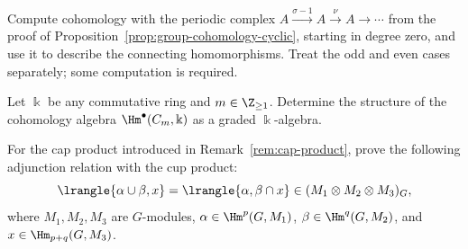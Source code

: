 \begin{Exercises}
	\begin{hint}
		Compute cohomology with the periodic complex
		$A\xrightarrow{\sigma-1}A\xrightarrow{\nu}A\to\cdots$ from the proof
		of Proposition~\ref{prop:group-cohomology-cyclic}, starting in degree
		zero, and use it to describe the connecting homomorphisms. Treat the odd
		and even cases separately; some computation is required.
	\end{hint}

	\item Let $\Bbbk$ be any commutative ring and $m\in\Z_{\geq1}$.
	Determine the structure of the cohomology algebra
	$\Hm^\bullet(C_m,\Bbbk)$ as a graded $\Bbbk$-algebra.

	\item For the cap product introduced in Remark~\ref{rem:cap-product},
	prove the following adjunction relation with the cup product:
	\[ \lrangle{\alpha\cup\beta,x}
	=\lrangle{\alpha,\beta\cap x}\in(M_1\otimes M_2\otimes M_3)_G, \]
	where $M_1,M_2,M_3$ are $G$-modules,
	$\alpha\in\Hm^p(G,M_1)$, $\beta\in\Hm^q(G,M_2)$, and
	$x\in\Hm_{p+q}(G,M_3)$.


\end{Exercises}
